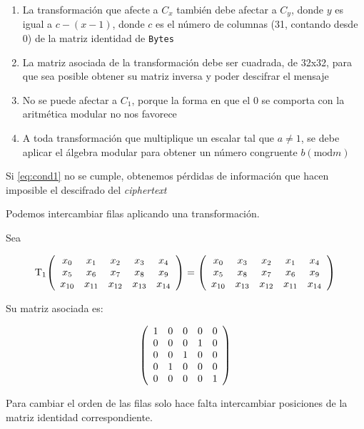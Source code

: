 \documentclass[a4paper]{article}
\newcommand*{\Scale}[2][4]{\scalebox{#1}{$#2$}}%
\begin{document}
\begin{enumerate}
    \item La transformación que afecte a $C_x$ también debe afectar a $C_y$,
donde $y$ es igual a $c-(x-1)$\label{eq:cond1}, donde $c$ es el número de
columnas (31, contando desde 0) de la matriz identidad de \texttt{Bytes}
\item La matriz asociada de la transformación debe ser cuadrada, de 32x32, para
que sea posible
obtener su matriz inversa y poder descifrar el mensaje
\item No se puede afectar a $C_1$, porque la forma en que el 0 se comporta con
la aritmética modular no nos favorece
\item A toda transformación que multiplique un escalar tal que $a \neq 1$, se
debe aplicar el álgebra modular para obtener un número congruente $b
(\text{mod} m)$
\end{enumerate}

Si \eqref{eq:cond1} no se cumple, obtenemos pérdidas de información que hacen
imposible el descifrado del \textit{ciphertext}

Podemos intercambiar filas aplicando una transformación.

Sea

 \[
\text{T}_1 \Scale[1]{
\left(
    \begin{array}{ccccc}
        x_0 & x_1 & x_2 & x_3 & x_4\\
        x_5 & x_6 & x_7 & x_8 & x_9\\
        x_{10} & x_{11} & x_{12} & x_{13} & x_{14}
    \end{array}
\right)
= 
\left(
\begin{array}{ccccc}
 x_0 & x_3 & x_2 & x_1 & x_4 \\
 x_5 & x_8 & x_7 & x_6 & x_9 \\
 x_{10} & x_{13} & x_{12} & x_{11} & x_{14}
\end{array}
\right) 
}
\]

Su matriz asociada es:

 \[
\Scale[1]{
\left(
\begin{array}{ccccc}
 1 & 0 & 0 & 0 & 0 \\
 0 & 0 & 0 & 1 & 0 \\
 0 & 0 & 1 & 0 & 0 \\
 0 & 1 & 0 & 0 & 0 \\
 0 & 0 & 0 & 0 & 1
\end{array}
\right)
}
\]

Para cambiar el orden de las filas solo hace falta intercambiar posiciones de
la matriz identidad correspondiente.
\end{document}
